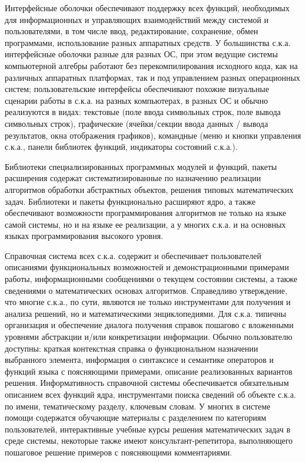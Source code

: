 Интерфейсные оболочки обеспечивают поддержку всех функций, необходимых для информационных и управляющих взаимодействий между системой и пользователями, в том числе ввод, редактирование, сохранение, обмен программами, использование разных аппаратных средств. У большинства с.к.а. интерфейсные оболочки разные для разных ОС, при этом ведущие системы компьютерной алгебры работают без перекомпилирования исходного кода, как на различных аппаратных платформах, так и под управлением разных операционных систем; пользовательские интерфейсы обеспечивают похожие визуальные сценарии работы в с.к.а. на разных компьютерах, в разных ОС и обычно реализуются в видах: текстовые (поле ввода символьных строк, поле вывода символьных строк), графические (ячейки/секции ввода данных / вывода результатов, окна отображения графиков), командные (меню и кнопки управления с.к.а., панели библиотек функций, индикаторы состояний с.к.а.).

Библиотеки специализированных программных модулей и функций, пакеты расширения содержат систематизированные по назначению реализации алгоритмов обработки абстрактных объектов, решения типовых математических задач. Библиотеки и пакеты функционально расширяют ядро, а также обеспечивают возможности программирования алгоритмов не только на языке самой системы, но и на языке ее реализации, а у многих с.к.а. и на основных языках программирования высокого уровня.

Справочная система всех с.к.а. содержит и обеспечивает пользователей описаниями функциональных возможностей и демонстрационными примерами работы, информационными сообщениями о текущем состоянии системы, а также сведениями о математических основах алгоритмов. Справедливо утверждение, что многие с.к.а., по сути, являются не только инструментами для получения и анализа решений, но и математическими энциклопедиями. Для с.к.а. типичны организация и обеспечение диалога получения справок пошагово с вложенными уровнями абстракции и/или конкретизации информации. Обычно пользователю доступны: краткая контекстная справка о функциональном назначении выбранного элемента, информация о синтаксисе и семантике операторов и функций языка с поясняющими примерами, описание реализованных вариантов решения. Информативность справочной системы обеспечивается обязательным описанием всех функций ядра, инструментами поиска сведений об объекте с.к.а. по имени, тематическому разделу, ключевым словам. У многих в системе помощи содержатся обучающие материалы с разделением по категориям пользователей, интерактивные учебные курсы решения математических задач в среде системы, некоторые также имеют консультант-репетитора, выполняющего пошаговое решение примеров с поясняющими комментариями.

